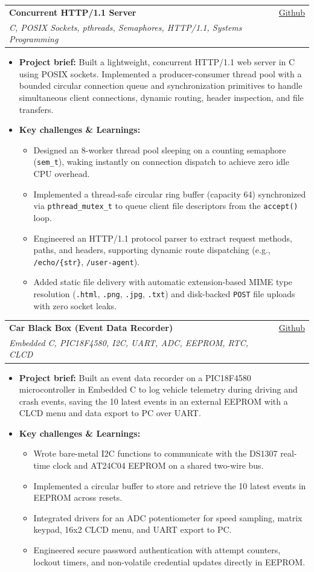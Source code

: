 \documentclass[letterpaper,11pt]{article}
\makeatletter
\newcommand{\resumeItem}[1]{
  \item
    {#1 \vspace{-2pt}}
}
\newcommand{\resumeSubheading}[4]{
  \vspace{-2pt}\item
    \begin{tabular*}{0.97\textwidth}[t]{l@{\extracolsep{\fill}}r}
      \textbf{#1} & #2 \\
      \textit{#3} & {#4} \\
    \end{tabular*}\vspace{-7pt}
}
\newcommand{\resumeItemListStart}{\begin{itemize}[topsep=2pt, itemsep=2pt, parsep=0pt]}
\newcommand{\resumeItemListEnd}{\end{itemize}\vspace{-5pt}}
\makeatother
\begin{document}
  \newpage

    \resumeSubheading
      {Concurrent HTTP/1.1 Server}{\href{https://github.com/k0-R0/HTTP_Server}{Github}}
      {C, POSIX Sockets, pthreads, Semaphores, HTTP/1.1, Systems Programming}{}
      \resumeItemListStart
        \resumeItem{\textbf{Project brief:} Built a lightweight, concurrent HTTP/1.1 web server in C using POSIX sockets. Implemented a producer-consumer thread pool with a bounded circular connection queue and synchronization primitives to handle simultaneous client connections, dynamic routing, header inspection, and file transfers.}
        \resumeItem{\textbf{Key challenges \& Learnings:}}
        \resumeItemListStart
            \resumeItem{Designed an 8-worker thread pool sleeping on a counting semaphore (\texttt{sem\_t}), waking instantly on connection dispatch to achieve zero idle CPU overhead.}
            \resumeItem{Implemented a thread-safe circular ring buffer (capacity 64) synchronized via \texttt{pthread\_mutex\_t} to queue client file descriptors from the \texttt{accept()} loop.}
            \resumeItem{Engineered an HTTP/1.1 protocol parser to extract request methods, paths, and headers, supporting dynamic route dispatching (e.g., \texttt{/echo/\{str\}}, \texttt{/user-agent}).}
            \resumeItem{Added static file delivery with automatic extension-based MIME type resolution (\texttt{.html}, \texttt{.png}, \texttt{.jpg}, \texttt{.txt}) and disk-backed \texttt{POST} file uploads with zero socket leaks.}
        \resumeItemListEnd
      \resumeItemListEnd

    \resumeSubheading
      {Car Black Box (Event Data Recorder)}{\href{https://github.com/k0-R0/car_blackbox}{Github}}
      {Embedded C, PIC18F4580, I2C, UART, ADC, EEPROM, RTC, CLCD}{}
      \resumeItemListStart
        \resumeItem{\textbf{Project brief:} Built an event data recorder on a PIC18F4580 microcontroller in Embedded C to log vehicle telemetry during driving and crash events, saving the 10 latest events in an external EEPROM with a CLCD menu and data export to PC over UART.}
        \resumeItem{\textbf{Key challenges \& Learnings:}}
        \resumeItemListStart
            \resumeItem{Wrote bare-metal I2C functions to communicate with the DS1307 real-time clock and AT24C04 EEPROM on a shared two-wire bus.}
            \resumeItem{Implemented a circular buffer to store and retrieve the 10 latest events in EEPROM across resets.}
            \resumeItem{Integrated drivers for an ADC potentiometer for speed sampling, matrix keypad, 16x2 CLCD menu, and UART export to PC.}
            \resumeItem{Engineered secure password authentication with attempt counters, lockout timers, and non-volatile credential updates directly in EEPROM.}
        \resumeItemListEnd
      \resumeItemListEnd
\end{document}
